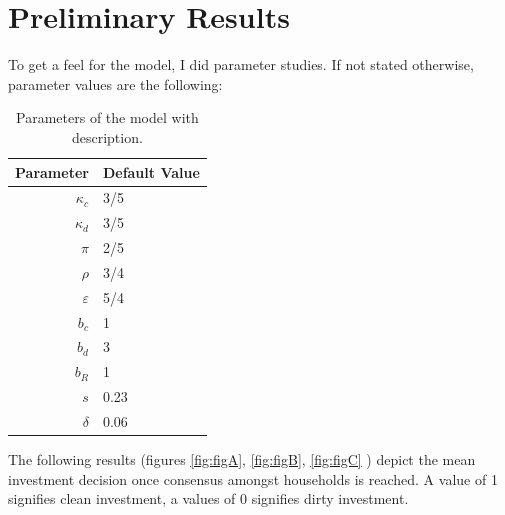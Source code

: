 \section{Preliminary Results}

To get a feel for the model, I did parameter studies. 
If not stated otherwise, parameter values are the following:
\begin{table}[H]
	\centering
	\begin{tabular}{r|l}
		Parameter & Default Value \\\hline
		$\kappa_c$ & 3/5 \\
		$\kappa_d$ & 3/5 \\
		$\pi$ & 2/5 \\
		$\rho$ & 3/4 \\
		$\varepsilon$ & 5/4 \\
		$b_c$ & 1 \\
		$b_d$ & 3 \\
		$b_R$ & 1 \\
		$s$ & 0.23 \\
		$\delta $ & 0.06 \\
	\end{tabular}
	\caption{Parameters of the model with description.}
	\label{tab:parameter_values}
\end{table}

\newpage

The following results (figures \ref{fig:figA}, \ref{fig:figB}, \ref{fig:figC} ) depict the mean investment decision once consensus amongst households is reached. A value of 1 signifies clean investment, a values of 0 signifies dirty investment.

